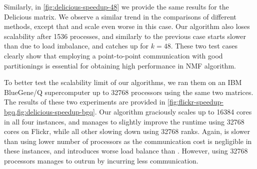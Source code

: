 Similarly, in \cref{fig:delicious-speedup-48} we provide the same results for the Delicious matrix.
We observe a similar trend in the comparisons of different methods, except that \urp and \unp scale even worse in this case.
Our algorithm also loses scalability after 1536 processes, and similarly to the previous case \cpp starts slower than \crp due to load imbalance, and catches up for $k = 48$.
These two test cases clearly show that employing a point-to-point communication with good partitionings is essential for obtaining high performance in NMF algorithm.

To better test the scalability limit of our algorithms, we ran them on an IBM BlueGene/Q supercomputer up to 32768 processors using the same two matrices.
The results of these two experiments are provided in \cref{fig:flickr-speedup-bgq,fig:delicious-speedup-bgq}.
Our algorithm graciously scales up to 16384 cores in all four instances, and \cpp manages to slightly improve the runtime using 32768 cores on Flickr, while all other slowing down using 32768 ranks.
Again, \cpp is slower than \crp using lower number of processors as the communication cost is negligible in these instances, and \cpp introduces worse load balance than \crp.
However, using 32768 processors \cpp manages to outrun \crp by incurring less communication.



